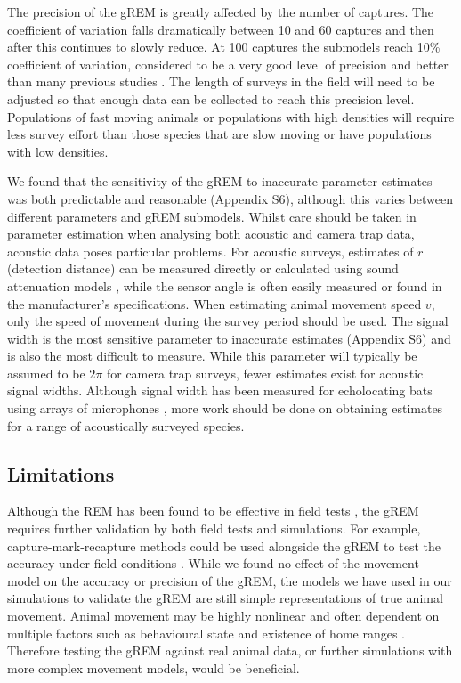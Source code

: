 The precision of the gREM is greatly affected by the number of captures.
The coefficient of variation falls dramatically between 10 and 60 captures and then after this continues to slowly reduce.
At 100 captures the submodels reach 10\% coefficient of variation, considered to be a very good level of precision and better than many previous studies \cite{thomas2012passive, o2003crouching, foster2012critique}.  The length of surveys in the field will need to be adjusted so that enough data can be collected to reach this precision level.
Populations of fast moving animals or populations with high densities will require less survey effort than those species that are slow moving or have populations with low densities. 

We found that the sensitivity of the gREM to inaccurate parameter estimates was both predictable and reasonable (Appendix S6), although this varies between different parameters and gREM submodels.
Whilst care should be taken in parameter estimation when analysing both acoustic and camera trap data, acoustic data poses particular problems.
For acoustic surveys, estimates of $r$ (detection distance) can be measured directly or calculated using sound attenuation models \cite{holderied2003echolocation}, while the sensor angle is often easily measured \cite{adams2012you} or found in the manufacturer's specifications.
When estimating animal movement speed $v$, only the speed of movement during the survey period should be used.
The signal width is the most sensitive parameter to inaccurate estimates (Appendix S6) and is also the most difficult to measure.  While this parameter will typically be assumed to be $2\pi$ for camera trap surveys, fewer estimates exist for acoustic signal widths.
Although signal width has been measured for echolocating bats using arrays of microphones \cite{brinklov2011}, more work should be done on obtaining estimates for a range of acoustically surveyed species.



\subsection{Limitations}

Although the REM has been found to be effective in field tests \cite{rowcliffe2008estimating, zero2013monitoring}, the gREM requires further validation by both field tests and simulations.
For example, capture-mark-recapture methods could be used alongside the gREM to test the accuracy under field conditions \cite{rowcliffe2008estimating}.
While we found no effect of the movement model on the accuracy or precision of the gREM, the models we have used in our simulations to validate the gREM are still simple representations of true animal movement.
Animal movement may be highly nonlinear and often dependent on multiple factors such as behavioural state and existence of home ranges \cite{smouse2010stochastic}.
Therefore testing the gREM against real animal data, or further simulations with more complex movement models, would be beneficial.


